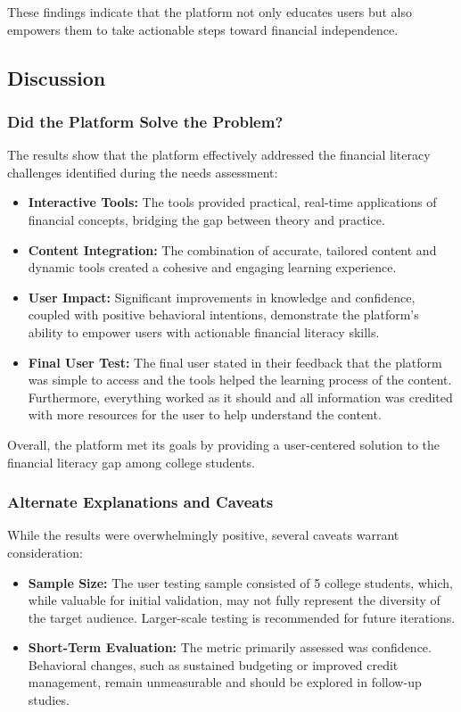 \documentclass[11pt,twocolumn]{article}
\begin{document}
These findings indicate that the platform not only educates users but also empowers them to take actionable steps toward financial independence.

\subsection{Discussion}

\subsubsection{Did the Platform Solve the Problem?}
The results show that the platform effectively addressed the financial literacy challenges identified during the needs assessment:
\begin{itemize}
    \item \textbf{Interactive Tools:} The tools provided practical, real-time applications of financial concepts, bridging the gap between theory and practice.
    \item \textbf{Content Integration:} The combination of accurate, tailored content and dynamic tools created a cohesive and engaging learning experience.
    \item \textbf{User Impact:} Significant improvements in knowledge and confidence, coupled with positive behavioral intentions, demonstrate the platform’s ability to empower users with actionable financial literacy skills.
    \item \textbf{Final User Test:} The final user stated in their feedback that the platform was simple to access and the tools helped the learning process of the content. Furthermore, everything worked as it should and all information was credited with more resources for the user to help understand the content.
\end{itemize}

Overall, the platform met its goals by providing a user-centered solution to the financial literacy gap among college students.

\subsubsection{Alternate Explanations and Caveats}
While the results were overwhelmingly positive, several caveats warrant consideration:
\begin{itemize}
    \item \textbf{Sample Size:} The user testing sample consisted of 5 college students, which, while valuable for initial validation, may not fully represent the diversity of the target audience. Larger-scale testing is recommended for future iterations.
    \item \textbf{Short-Term Evaluation:} The metric primarily assessed was confidence. Behavioral changes, such as sustained budgeting or improved credit management, remain unmeasurable and should be explored in follow-up studies.
\end{itemize}
\end{document}
